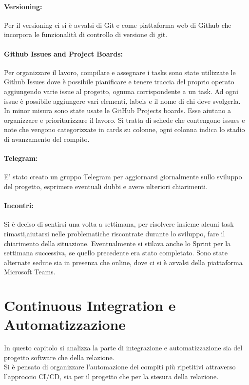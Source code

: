     \paragraph{Versioning: }
    Per il versioning ci si è avvalsi di Git e come piattaforma web di Github che incorpora le funzionalità di controllo di versione di git. 
    
    \paragraph{Github Issues and Project Boards: }
    Per organizzare il lavoro, compilare e assegnare i tasks sono state utilizzate le Github Issues dove è possibile pianificare e tenere traccia del proprio operato aggiungendo varie issue al progetto, ognuna corrispondente a un task. Ad ogni issue è possibile aggiungere vari elementi, labels e il nome di chi deve svolgerla.\\ In minor misura sono state usate le GitHub Projects boards. Esse aiutano a organizzare e prioritarizzare il lavoro. Si tratta di schede che contengono issues e note che vengono categorizzate in cards su colonne, ogni colonna indica lo stadio di avanzamento del compito.\\
   
    \paragraph{Telegram: }
    E' stato creato un gruppo Telegram per aggiornarsi giornalmente sullo sviluppo del progetto, esprimere eventuali dubbi e avere ulteriori chiarimenti. 
    
    \paragraph{Incontri: }
    Si è deciso di sentirsi una volta a settimana, per risolvere insieme alcuni task rimasti,aiutarsi nelle problematiche riscontrate durante lo sviluppo, fare il chiarimento della situazione. Eventualmente si stilava anche lo Sprint per la settimana successiva, se quello precedente era stato completato. Sono state alternate sedute sia in presenza che online, dove ci si è avvalsi della piattaforma Microsoft Teams.
    
     

\section{Continuous Integration e Automatizzazione}
\label{chap:CI}
In questo capitolo si analizza la parte di integrazione e automatizzazione sia del progetto software che della relazione.\\  Si è pensato di organizzare l'automazione dei compiti più ripetitivi attraverso l'approccio CI/CD, sia per il progetto che per la stesura della relazione.
